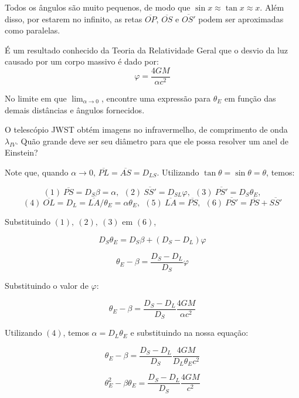 \documentclass[11pt]{article}
\begin{document}
\begin{pproblem}
    Todos os ângulos são muito pequenos, de modo que \(\sin x \approx \tan x \approx x\). Além disso, por estarem no infinito, as retas \(\overline{OP}\), \(\overline{OS}\) e \(\overline{OS'}\) podem ser aproximadas como paralelas.

    É um resultado conhecido da Teoria da Relatividade Geral que o desvio da luz causado por um corpo massivo é dado por:
    \[\varphi = \frac{4GM}{\alpha c^2}\]
    \begin{alternativas}
        \item No limite em que \(\lim_{\alpha \rightarrow 0}\), encontre uma expressão para \(\theta_E\) em função das demais distâncias e ângulos fornecidos.
    
        \item O telescópio JWST obtém imagens no infravermelho, de comprimento de onda \(\lambda_{IV}\). Quão grande deve ser seu diâmetro para que ele possa resolver um anel de Einstein?
    \end{alternativas}

    \begin{pssolution*}{}{}
        \begin{alternativas}
            \item Note que, quando \(\alpha \rightarrow 0\), \(\overline{PL}=\overline{AS}=D_{LS}\). Utilizando \(\tan\theta = \sin\theta=\theta\), temos:
            
            \[(1)\ \overline{PS} = D_S\beta = \alpha, \ \ (2)\ \overline{SS'} = D_{SL}\varphi, \ \ (3)\ \overline{PS'} = D_S\theta_E,\] 
            \[(4)\ \overline{OL} = D_L = \overline{LA}/\theta_E = \alpha\theta_E, \ \ (5)\ \overline{LA}=\overline{PS}, \ \ (6)\ \overline{PS'} = \overline{PS}+\overline{SS'}\]

            Substituindo \((1), \ (2), \ (3)\) em \((6)\), 

            \[D_S\theta_E=D_S\beta+(D_S-D_L)\varphi\]

            \[\theta_E-\beta = \frac{D_S-D_L}{D_S}\varphi\]

            Substituindo o valor de \(\varphi\):

            \[\theta_E-\beta = \frac{D_S-D_L}{D_S}\frac{4GM}{\alpha c^2}\]

            Utilizando \((4)\), temos \(\alpha=D_L\theta_E\) e substituindo na nossa equação:

            \[\theta_E-\beta = \frac{D_S-D_L}{D_S}\frac{4GM}{D_L\theta_E c^2}\]

            \[\theta_E^2-\beta\theta_E = \frac{D_S-D_L}{D_S}\frac{4GM}{c^2}\]


\end{alternativas}
\end{pssolution*}
\end{pproblem}
\end{document}
